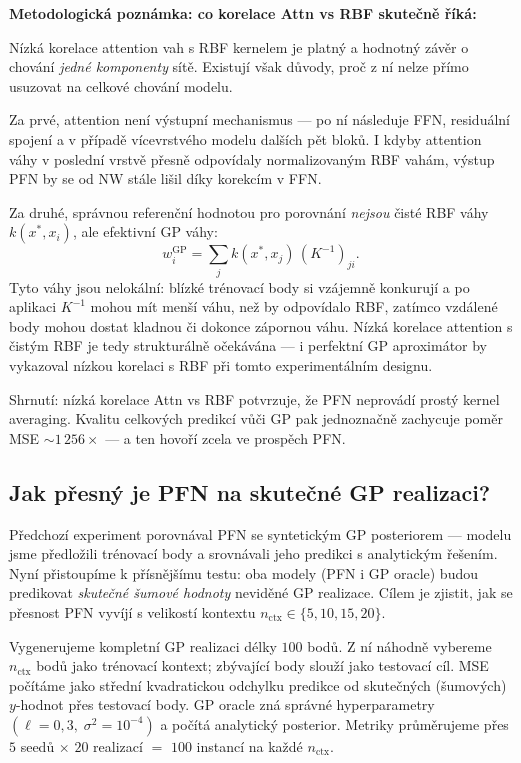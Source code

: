 \textbf{Metodologická poznámka: co korelace Attn vs RBF skutečně říká:}

Nízká korelace attention vah s RBF kernelem je platný a hodnotný závěr o chování \textit{jedné komponenty} sítě.
Existují však důvody, proč z ní nelze přímo usuzovat na celkové chování modelu.

Za prvé, attention není výstupní mechanismus — po ní následuje FFN, residuální spojení a v případě vícevrstvého modelu dalších pět bloků.
I kdyby attention váhy v poslední vrstvě přesně odpovídaly normalizovaným RBF vahám, výstup PFN by se od NW stále lišil díky korekcím v FFN.

Za druhé, správnou referenční hodnotou pro porovnání \textit{nejsou} čisté RBF váhy $k(x^*, x_i)$, ale efektivní GP váhy:
$$w_i^{\text{GP}} = \sum_j k(x^*, x_j)\,(K^{-1})_{ji}.$$
Tyto váhy jsou nelokální: blízké trénovací body si vzájemně konkurují a po aplikaci $K^{-1}$ mohou mít menší váhu, než by odpovídalo RBF, zatímco vzdálené body mohou dostat kladnou či dokonce zápornou váhu.
Nízká korelace attention s čistým RBF je tedy strukturálně očekávána — i perfektní GP aproximátor by vykazoval nízkou korelaci s RBF při tomto experimentálním designu.

Shrnutí: nízká korelace Attn vs RBF potvrzuje, že PFN neprovádí prostý kernel averaging.
Kvalitu celkových predikcí vůči GP pak jednoznačně zachycuje poměr MSE ${\sim}1\,256\times$ — a ten hovoří zcela ve prospěch PFN.

\subsection{Jak přesný je PFN na skutečné GP realizaci?}

Předchozí experiment porovnával PFN se syntetickým GP posteriorem — modelu jsme předložili trénovací body a srovnávali jeho predikci s analytickým řešením.
Nyní přistoupíme k přísnějšímu testu: oba modely (PFN i GP oracle) budou predikovat \textit{skutečné šumové hodnoty} neviděné GP realizace.
Cílem je zjistit, jak se přesnost PFN vyvíjí s velikostí kontextu $n_{\text{ctx}} \in \{5, 10, 15, 20\}$.
\par

Vygenerujeme kompletní GP realizaci délky $100$ bodů.
Z ní náhodně vybereme $n_{\text{ctx}}$ bodů jako trénovací kontext; zbývající body slouží jako testovací cíl.
MSE počítáme jako střední kvadratickou odchylku predikce od skutečných (šumových) $y$-hodnot přes testovací body.
GP oracle zná správné hyperparametry $(\ell = 0{,}3,\; \sigma^2 = 10^{-4})$ a počítá analytický posterior.
Metriky průměrujeme přes $5$ seedů $\times$ $20$ realizací $=$ $100$ instancí na každé $n_{\text{ctx}}$.
\par

